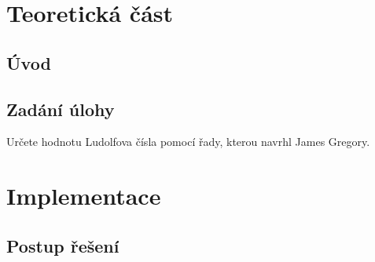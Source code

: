 \documentclass[11pt,a4paper,twoside,openright]{report}
\begin{document}
	
	
	
	\setcounter{tocdepth}{2}
	\tableofcontents
	
	\chapter{Teoretická část}
	\pagestyle{fancy}
	
	\section{Úvod}
	
	
	
	\section{Zadání úlohy}
	Určete hodnotu Ludolfova čísla pomocí řady, kterou navrhl James Gregory.
	
	\chapter{Implementace}
	\section{Postup řešení}
\end{document}
